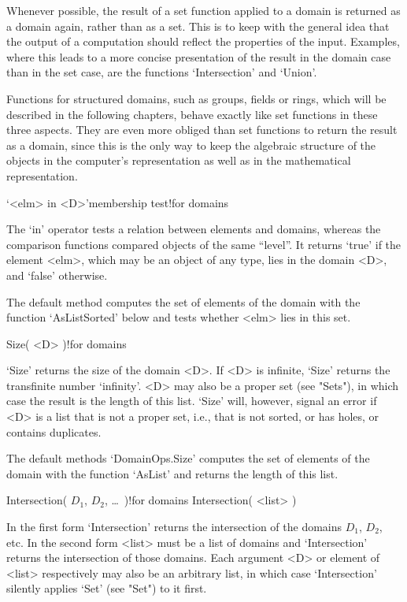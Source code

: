 Whenever possible, the result  of a set  function applied to a domain  is
returned as a domain  again, rather than as a  set. This is to keep  with
the general idea  that  the output of a  computation  should reflect  the
properties of the input.  Examples, where  this leads  to a more  concise
presentation of the result  in the domain case than  in the set case, are
the functions `Intersection' and `Union'.

Functions for structured domains, such  as groups, fields or rings, which
will  be described  in  the following chapters,   behave exactly like set
functions  in these three  aspects. They  are even  more obliged than set
functions to return the result as a domain, since this is the only way to
keep  the     algebraic structure of the     objects  in  the computer's
representation as well as in the mathematical representation.

\>`<elm> in <D>'{membership test}!{for domains}

The `in' operator tests a relation  between elements and domains, whereas
the  comparison  functions  compared objects of  the  same  ``level''. It
returns `true' if the element <elm>, which may  be an object of any type,
lies in the domain <D>, and `false' otherwise.

The default  method computes the  set of elements  of the domain with the
function `AsListSorted' below and tests whether <elm> lies in this set.

\>Size( <D> )!{for domains}

`Size' returns  the size of the  domain  <D>. If <D> is  infinite, `Size'
returns the transfinite  number `infinity'. <D>  may also be a proper set
(see "Sets"), in which case the result is the length of this list. `Size'
will, however, signal an error if <D> is a list that is not a proper set,
i.e., that is not sorted, or has holes, or contains duplicates.

The default methods `DomainOps.Size' computes the  set of elements of the
domain with the function `AsList' and returns the length of this list.

\>Intersection( $D_1$, $D_2$, \dots\ )!{for domains}
\)Intersection( <list> )

In the first form `Intersection'  returns the intersection of the domains
$D_1$, $D_2$, etc.  In the second  form <list> must  be a list of domains
and `Intersection'  returns   the intersection   of those  domains.  Each
argument <D>  or element of <list> respectively  may also be an arbitrary
list, in which case `Intersection' silently applies  `Set' (see "Set") to
it first.

